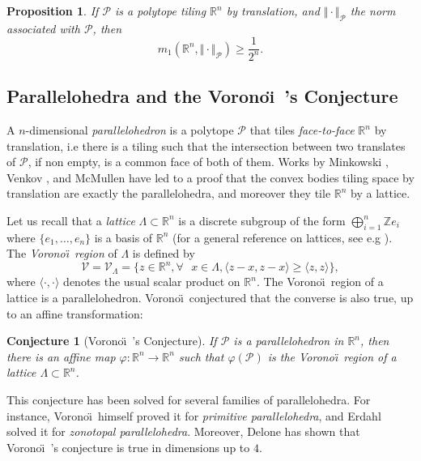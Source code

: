 \documentclass{amsart}                     %
\newtheorem{prop}{Proposition}
\newtheorem{conj}{Conjecture}
\newcommand{\Z}{{\mathbb Z}}
\newcommand{\R}{{\mathbb R}}
\begin{document}
\begin{prop}\label{borneinf}
If $\mathcal{P}$ is a polytope tiling $\R^n$ by translation, and $\Vert   \cdot\Vert  _\mathcal{P}$ the norm associated with $\mathcal{P}$, then 
$$m_1(\R^n,\Vert   \cdot\Vert  _\mathcal{P})\geq \frac{1}{2^n}.$$
\end{prop}

\subsection{Parallelohedra and the Vorono\"\i\ 's Conjecture}\label{prelimVoro}

A $n$-dimensional \textit{parallelohedron} is a polytope $\mathcal{P}$ that tiles \textit{face-to-face} $\R^n$ by translation, i.e there is a tiling such that the intersection between two translates of $\mathcal{P}$, if non empty, is a common face of both of them. Works by Minkowski \cite{Minkowski1897}, Venkov \cite{MR0094790}, and McMullen \cite{MR582003} have led to a proof that the convex bodies tiling space by translation are exactly the parallelohedra, and moreover they tile $\R^n$ by a lattice.

Let us recall that a \textit{lattice} $\Lambda\subset \R^n$ is a discrete subgroup of the form $\bigoplus_{i=1}^n \Z e_i$ where $\{e_1,\ldots,e_n \}$ is a basis of $\R^n$ (for a general reference on lattices, see e.g \cite{Conway:1987:SLG:39091}). The \textit{Vorono\"\i\  region} of $\Lambda$ is defined by
$$\mathcal{V}=\mathcal{V}_\Lambda=\{z\in \R^n, \forall \text{ } x\in  \Lambda, \langle z-x, z-x \rangle \geq \langle z, z \rangle \},$$
where  $\langle \cdot  , \cdot \rangle$ denotes the usual scalar product on $\R^n$.
The Vorono\"\i\  region of a lattice is a parallelohedron. Vorono\"\i\  conjectured that the converse is also true, up to an affine transformation:

\begin{conj}[Vorono\"\i\ 's Conjecture] 
If $\mathcal{P}$ is a parallelohedron in $\R^n$, then there is an affine map $\varphi:\R^n\to\R^n$ such that $\varphi(\mathcal{P})$ is the Vorono\"\i\  region of a lattice $\Lambda\subset \R^n$.
\end{conj}

This conjecture has been solved for several families of parallelohedra. For instance, Vorono\"\i\  himself \cite{MR1580754} proved it for \textit{primitive parallelohedra}, and Erdahl \cite{MR1703597} solved it for \textit{zonotopal parallelohedra}. Moreover, Delone \cite{zbMATH02567417} has shown that Vorono\"\i\ 's conjecture is true in dimensions up to $4$.
\end{document}
